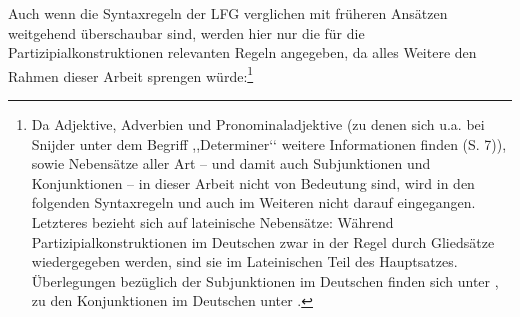 \documentclass[12pt,a4paper]{article}
\begin{document}
Auch wenn die Syntaxregeln der LFG verglichen mit früheren Ansätzen weitgehend überschaubar sind, werden hier nur die für die Partizipialkonstruktionen relevanten Regeln angegeben, da alles Weitere den Rahmen dieser Arbeit sprengen würde:\footnote{Da Adjektive, Adverbien und Pronominaladjektive (zu denen sich u.a. bei Snijder unter dem Begriff ,,Determiner‘‘ weitere Informationen finden (S. 7)), sowie Nebensätze aller Art  -- und damit auch Subjunktionen und Konjunktionen -- in dieser Arbeit nicht von Bedeutung sind, wird in den folgenden Syntaxregeln und auch im Weiteren nicht darauf eingegangen. Letzteres bezieht sich auf lateinische Nebensätze: Während Partizipialkonstruktionen im Deutschen zwar in der Regel durch Gliedsätze wiedergegeben werden, sind sie im Lateinischen Teil des Hauptsatzes. Überlegungen bezüglich der Subjunktionen im Deutschen finden sich unter \cite[103-119]{Skript}, zu den Konjunktionen im Deutschen unter \cite[120-136]{Skript}.} 

\end{document}
